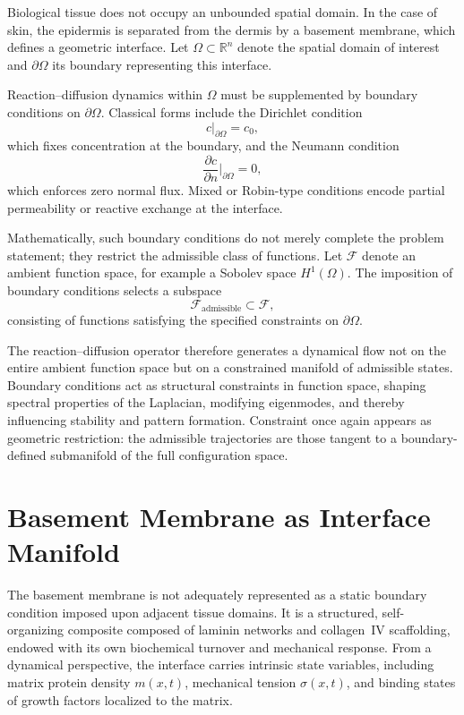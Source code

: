 \documentclass[12pt]{book}
\begin{document}
Biological tissue does not occupy an unbounded spatial domain. In the
case of skin, the epidermis is separated from the dermis by a basement
membrane, which defines a geometric interface. Let $\Omega \subset
\mathbb{R}^n$ denote the spatial domain of interest and $\partial
\Omega$ its boundary representing this interface.

Reaction--diffusion dynamics within $\Omega$ must be supplemented by
boundary conditions on $\partial \Omega$. Classical forms include the
Dirichlet condition
\[
c|_{\partial \Omega} = c_0,
\]
which fixes concentration at the boundary, and the Neumann condition
\[
\frac{\partial c}{\partial n}\Big|_{\partial \Omega} = 0,
\]
which enforces zero normal flux. Mixed or Robin-type conditions encode
partial permeability or reactive exchange at the interface.

Mathematically, such boundary conditions do not merely complete the
problem statement; they restrict the admissible class of functions.
Let $\mathcal{F}$ denote an ambient function space, for example a
Sobolev space $H^1(\Omega)$. The imposition of boundary conditions
selects a subspace
\[
\mathcal{F}_{\text{admissible}} \subset \mathcal{F},
\]
consisting of functions satisfying the specified constraints on
$\partial \Omega$.

The reaction--diffusion operator therefore generates a dynamical flow
not on the entire ambient function space but on a constrained manifold
of admissible states. Boundary conditions act as structural constraints
in function space, shaping spectral properties of the Laplacian,
modifying eigenmodes, and thereby influencing stability and pattern
formation. Constraint once again appears as geometric restriction:
the admissible trajectories are those tangent to a boundary-defined
submanifold of the full configuration space.

\section{Basement Membrane as Interface Manifold}

The basement membrane is not adequately represented as a static boundary
condition imposed upon adjacent tissue domains. It is a structured,
self-organizing composite composed of laminin networks and collagen~IV
scaffolding, endowed with its own biochemical turnover and mechanical
response. From a dynamical perspective, the interface carries intrinsic
state variables, including matrix protein density $m(x,t)$, mechanical
tension $\sigma(x,t)$, and binding states of growth factors localized to
the matrix.
\end{document}
